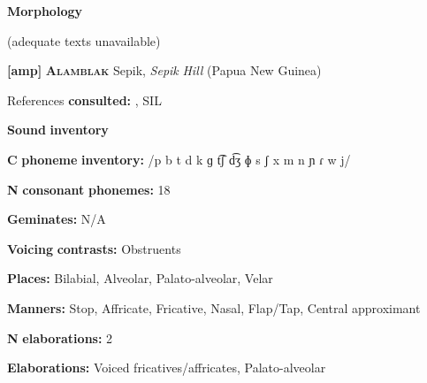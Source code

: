\begin{styleBody}
\textbf{Morphology}
\end{styleBody}

\begin{styleBody}
(adequate texts unavailable)
\end{styleBody}

\begin{styleBody}
\textbf{[amp]}   \textbf{\textsc{Alamblak}}  Sepik, \textit{Sepik} \textit{Hill} (Papua New Guinea)
\end{styleBody}

\begin{styleBody}
References \textbf{consulted:} \citet{Bruce1984}, SIL 
\end{styleBody}

\begin{styleBody}
\textbf{Sound} \textbf{inventory}
\end{styleBody}

\begin{styleBody}
\textbf{C} \textbf{phoneme} \textbf{inventory:} /p b t d k ɡ t͡ʃ d͡ʒ ɸ s ʃ x m n ɲ ɾ w j/
\end{styleBody}

\begin{styleBody}
\textbf{N} \textbf{consonant} \textbf{phonemes:} 18
\end{styleBody}

\begin{styleBody}
\textbf{Geminates:} N/A
\end{styleBody}

\begin{styleBody}
\textbf{Voicing} \textbf{contrasts:} Obstruents
\end{styleBody}

\begin{styleBody}
\textbf{Places:} Bilabial, Alveolar, Palato-alveolar, Velar
\end{styleBody}

\begin{styleBody}
\textbf{Manners:} Stop, Affricate, Fricative, Nasal, Flap/Tap, Central approximant
\end{styleBody}

\begin{styleBody}
\textbf{N} \textbf{elaborations:} 2
\end{styleBody}

\begin{styleBody}
\textbf{Elaborations:} Voiced fricatives/affricates, Palato-alveolar
\end{styleBody}

